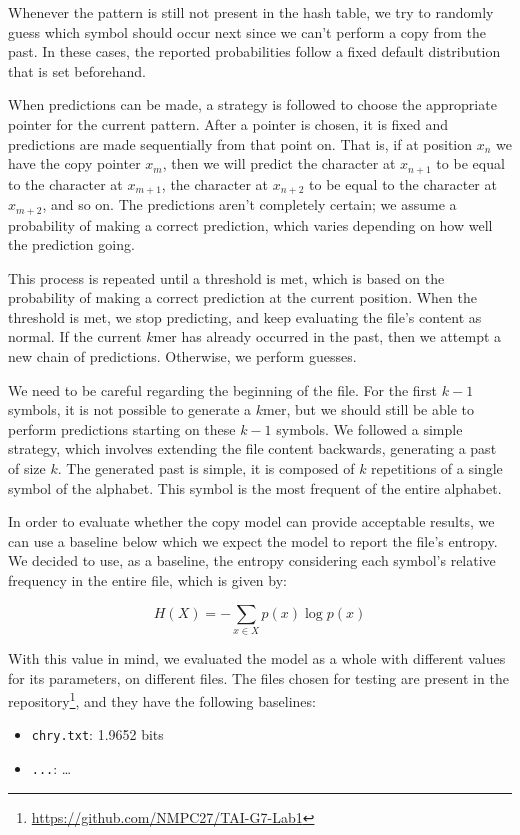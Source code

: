 \documentclass{article}
\begin{document}
Whenever the pattern is still not present in the hash table, we try to randomly guess which symbol should occur next since we can't perform a copy from the past.
In these cases, the reported probabilities follow a fixed default distribution that is set beforehand.

When predictions can be made, a strategy is followed to choose the appropriate pointer for the current pattern.
After a pointer is chosen, it is fixed and predictions are made sequentially from that point on.
That is, if at position $x_n$ we have the copy pointer $x_m$, then we will predict the character at $x_{n+1}$ to be equal to the character at $x_{m+1}$, the character at $x_{n+2}$ to be equal to the character at $x_{m+2}$, and so on.
The predictions aren't completely certain; we assume a probability of making a correct prediction, which varies depending on how well the prediction going.

This process is repeated until a threshold is met, which is based on the probability of making a correct prediction at the current position.
When the threshold is met, we stop predicting, and keep evaluating the file's content as normal.
If the current $k$mer has already occurred in the past, then we attempt a new chain of predictions.
Otherwise, we perform guesses.

We need to be careful regarding the beginning of the file.
For the first $k-1$ symbols, it is not possible to generate a $k$mer, but we should still be able to perform predictions starting on these $k-1$ symbols.
We followed a simple strategy, which involves extending the file content backwards, generating a past of size $k$.
The generated past is simple, it is composed of $k$ repetitions of a single symbol of the alphabet.
This symbol is the most frequent of the entire alphabet.

In order to evaluate whether the copy model can provide acceptable results, we can use a baseline below which we expect the model to report the file's entropy.
We decided to use, as a baseline, the entropy considering each symbol's relative frequency in the entire file, which is given by:

$$
H(X) = - \sum_{x \in X}{p(x) \log{p(x)}}
$$

With this value in mind, we evaluated the model as a whole with different values for its parameters, on different files.
The files chosen for testing are present in the repository\footnote{\url{https://github.com/NMPC27/TAI-G7-Lab1}}, and they have the following baselines:
\begin{itemize}
    \item \verb|chry.txt|: 1.9652 bits
    \item \verb|...|: \dots
\end{itemize}
\end{document}
